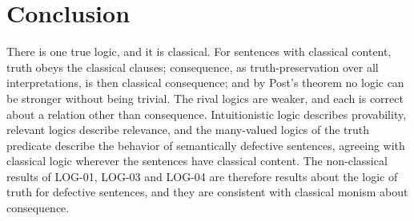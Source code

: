 \documentclass{situationist-preprint}
\begin{document}
\section{Conclusion}

There is one true logic, and it is classical. For sentences with classical content, truth obeys the classical clauses; consequence, as truth-preservation over all interpretations, is then classical consequence; and by Post's theorem no logic can be stronger without being trivial. The rival logics are weaker, and each is correct about a relation other than consequence. Intuitionistic logic describes provability, relevant logics describe relevance, and the many-valued logics of the truth predicate describe the behavior of semantically defective sentences, agreeing with classical logic wherever the sentences have classical content. The non-classical results of LOG-01, LOG-03 and LOG-04 are therefore results about the logic of truth for defective sentences, and they are consistent with classical monism about consequence.
\end{document}
